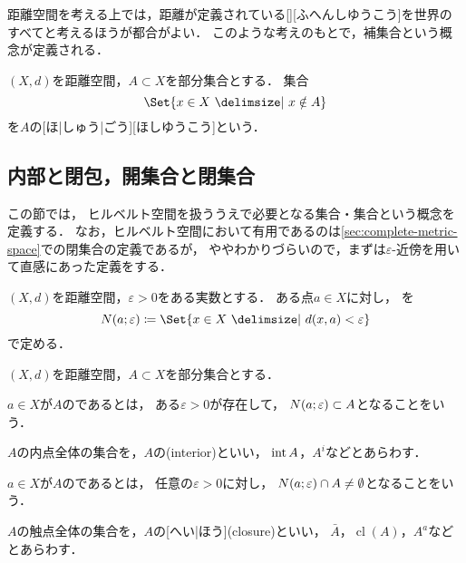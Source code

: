\documentclass[../sotsu.tex]{subfiles}
\begin{document}
距離空間を考える上では，距離が定義されている[][ふへんしゆうこう]を世界のすべてと考えるほうが都合がよい．
このような考えのもとで，補集合という概念が定義される．

\begin{definition}
    $(X, d)$を距離空間，$A \subset X$を部分集合とする．
    集合
    \begin{equation*}
        \Set{  x \in X  \given  x \notin A  }
    \end{equation*}
    を$A$の[ほ|しゅう|ごう][ほしゆうこう]という．
\end{definition}




\subsection{内部と閉包，開集合と閉集合}
\label{sec:interior-and-closure}

この節では，
ヒルベルト空間を扱ううえで必要となる集合・集合という概念を定義する．
なお，ヒルベルト空間において有用であるのは\cref{sec:complete-metric-space}での閉集合の定義であるが，
ややわかりづらいので，まずは$\varepsilon$-近傍を用いて直感にあった定義をする．


\begin{definition}
    $(X, d)$を距離空間，$\varepsilon > 0$をある実数とする．
    ある点$a \in X$に対し，%
    を
    \begin{equation}
        \neigh(a; \varepsilon) \coloneq \Set{  x \in X  \given  d(x, a) < \varepsilon  }
    \end{equation}
    で定める．
\end{definition}

$(X, d)$を距離空間，$A \subset X$を部分集合とする．

\begin{definition}
    \label{dfn:interior}
    $a \in X$が$A$のであるとは，
    ある$\varepsilon > 0$が存在して，
    $N(a; \varepsilon) \subset A$となることをいう．

    $A$の内点全体の集合を，$A$の(interior)といい，
    $\operatorname{int}{A}$，$A^i$などとあらわす．
\end{definition}

\begin{definition}
    \label{dfn:closure}
    $a \in X$が$A$のであるとは，
    任意の$\varepsilon > 0$に対し，
    $N(a; \varepsilon) \cap A \neq \emptyset$となることをいう．

    $A$の触点全体の集合を，$A$の[へい|ほう](closure)といい，
    $\bar{A}$，$\operatorname{cl}(A)$，$A^a$などとあらわす．
\end{definition}
\end{document}
